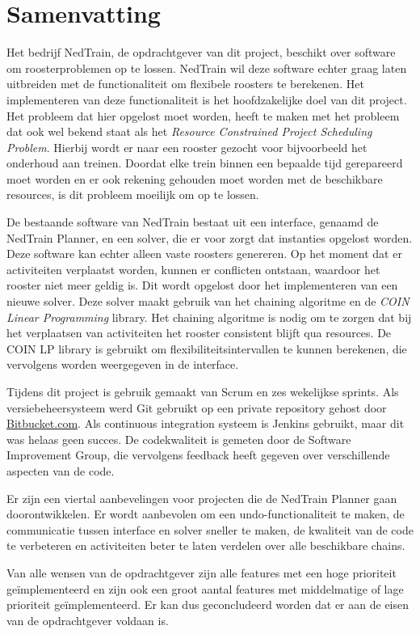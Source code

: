 \section*{Samenvatting}
Het bedrijf NedTrain, de opdrachtgever van dit project, beschikt over software om roosterproblemen op te lossen. NedTrain wil deze software echter graag laten uitbreiden met de functionaliteit om flexibele roosters te berekenen. Het implementeren van deze functionaliteit is het hoofdzakelijke doel van dit project. Het probleem dat hier opgelost moet worden, heeft te maken met het probleem dat ook wel bekend staat als het \emph{Resource Constrained Project Scheduling Problem}. Hierbij wordt er naar een rooster gezocht voor bijvoorbeeld het onderhoud aan treinen. Doordat elke trein binnen een bepaalde tijd gerepareerd moet worden en er ook rekening gehouden moet worden met de beschikbare resources, is dit probleem moeilijk om op te lossen.

De bestaande software van NedTrain bestaat uit een interface, genaamd de NedTrain Planner, en een solver, die er voor zorgt dat instanties opgelost worden. Deze software kan echter alleen vaste roosters genereren. Op het moment dat er activiteiten verplaatst worden, kunnen er conflicten ontstaan, waardoor het rooster niet meer geldig is. Dit wordt opgelost door het implementeren van een nieuwe solver. Deze solver maakt gebruik van het chaining algoritme en de \emph{COIN Linear Programming} library. Het chaining algoritme is nodig om te zorgen dat bij het verplaatsen van activiteiten het rooster consistent blijft qua resources. De COIN LP library is gebruikt om flexibiliteitsintervallen te kunnen berekenen, die vervolgens worden weergegeven in de interface. 

Tijdens dit project is gebruik gemaakt van Scrum en zes wekelijkse sprints. Als versiebeheersysteem werd Git gebruikt op een private repository gehost door \href{http://bitbucket.com}{Bitbucket.com}. Als continuous integration systeem is Jenkins gebruikt, maar dit was helaas geen succes. De codekwaliteit is gemeten door de Software Improvement Group, die vervolgens feedback heeft gegeven over verschillende aspecten van de code. 

Er zijn een viertal aanbevelingen voor projecten die de NedTrain Planner gaan doorontwikkelen. Er wordt aanbevolen om een undo-functionaliteit te maken, de communicatie tussen interface en solver sneller te maken, de kwaliteit van de code te verbeteren en activiteiten beter te laten verdelen over alle beschikbare chains.

Van alle wensen van de opdrachtgever zijn alle features met een hoge prioriteit ge\"implementeerd en zijn ook een groot aantal features met middelmatige of lage prioriteit ge\"implementeerd. Er kan dus geconcludeerd worden dat er aan de eisen van de opdrachtgever voldaan is.
